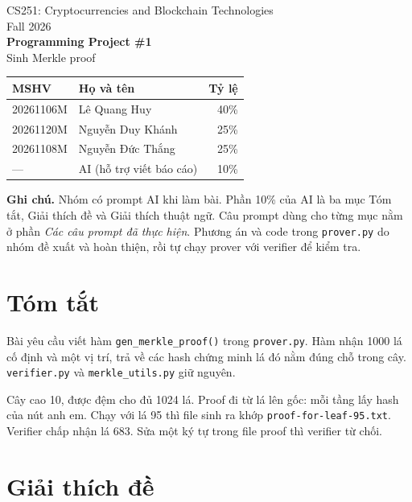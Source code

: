 \documentclass[12pt,a4paper]{article}
\begin{document}
\begin{titlepage}
\centering
{\large CS251: Cryptocurrencies and Blockchain Technologies}\\[0.35em]
{\large Fall 2026}\\[1.6em]
{\LARGE\bfseries Programming Project \#1}\\[0.45em]
{\Large Sinh Merkle proof}\\[2.2em]

\begin{tabular}{@{}llr@{}}
\toprule
MSHV & Họ và tên & Tỷ lệ \\
\midrule
20261106M & Lê Quang Huy & 40\% \\
20261120M & Nguyễn Duy Khánh & 25\% \\
20261108M & Nguyễn Đức Thắng & 25\% \\
--- & AI (hỗ trợ viết báo cáo) & 10\% \\
\bottomrule
\end{tabular}

\vspace{2.4em}
\begin{minipage}{0.92\textwidth}
\raggedright
\textbf{Ghi chú.} Nhóm có prompt AI khi làm bài. Phần 10\% của AI là ba mục Tóm tắt, Giải thích đề và Giải thích thuật ngữ. Câu prompt dùng cho từng mục nằm ở phần \textit{Các câu prompt đã thực hiện}. Phương án và code trong \texttt{prover.py} do nhóm đề xuất và hoàn thiện, rồi tự chạy prover với verifier để kiểm tra.
\end{minipage}
\end{titlepage}

\section{Tóm tắt}

Bài yêu cầu viết hàm \texttt{gen\_merkle\_proof()} trong \texttt{prover.py}. Hàm nhận 1000 lá cố định và một vị trí, trả về các hash chứng minh lá đó nằm đúng chỗ trong cây. \texttt{verifier.py} và \texttt{merkle\_utils.py} giữ nguyên.

Cây cao 10, được đệm cho đủ 1024 lá. Proof đi từ lá lên gốc: mỗi tầng lấy hash của nút anh em. Chạy với lá 95 thì file sinh ra khớp \texttt{proof-for-leaf-95.txt}. Verifier chấp nhận lá 683. Sửa một ký tự trong file proof thì verifier từ chối.

\section{Giải thích đề}
\end{document}
